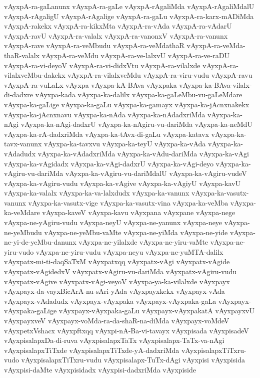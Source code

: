 {vAyxpA-ra-gaLanunx
vAyxpA-ra-gaLe
vAyxpA-rAgaliMda
vAyxpA-rAgaliMdalU
vAyxpA-rAgaligU
vAyxpA-rAgalige
vAyxpA-ra-gaLu
vAyxpA-ra-karx-mADiMda
vAyxpA-rakekx
vAyxpA-ra-kikxMta
vAyxpA-ra-vAda
vAyxpA-ra-vAdarU
vAyxpA-ravU
vAyxpA-ra-valalx
vAyxpA-ra-vanonxV
vAyxpA-ra-vanunx
vAyxpA-rave
vAyxpA-ra-veMbudu
vAyxpA-ra-veMdathaR
vAyxpA-ra-veMda-thaR-valalx
vAyxpA-ra-veMdu
vAyxpA-ra-ve-lalxvU
vAyxpA-ra-ve-raDU
vAyxpA-ra-vi-deyoV
vAyxpA-ra-vi-didxVtu
vAyxpA-ra-vilalxde
vAyxpA-ra-vilalxveMbu-dakekx
vAyxpA-ra-vilalxveMdu
vAyxpA-ra-viru-vudu
vAyxpA-ravu
vAyxpA-ra-vuLaLx
vAyxpa
vAyxpa-kA-BAva
vAyxpaka
vAyxpa-ka-BAva-vilalx-di-dadxre
vAyxpa-kada
vAyxpa-ka-dalilx
vAyxpa-ka-gaLeMbu-vu-gaLeMdare
vAyxpa-ka-gaLige
vAyxpa-ka-gaLu
vAyxpa-ka-gamayx
vAyxpa-ka-jAcnxnakekx
vAyxpa-ka-jAcnxnavu
vAyxpa-ka-nAda
vAyxpa-ka-nAdadxriMda
vAyxpa-ka-nAgi
vAyxpa-ka-nAgi-dadxrU
vAyxpa-ka-nAgiru-vu-dariMda
vAyxpa-ka-neMdU
vAyxpa-ka-rA-dadxriMda
vAyxpa-ka-tAvx-di-gaLu
vAyxpa-katavx
vAyxpa-ka-tavx-vanunx
vAyxpa-ka-tavxvu
vAyxpa-ka-teyU
vAyxpa-ka-vAda
vAyxpa-ka-vAdadudx
vAyxpa-ka-vAdadxriMda
vAyxpa-ka-vAdu-dariMda
vAyxpa-ka-vAgi
vAyxpa-ka-vAgidadx
vAyxpa-ka-vAgi-dadxrU
vAyxpa-ka-vAgi-deyo
vAyxpa-ka-vAgiru-vu-dariMda
vAyxpa-ka-vAgiru-vu-dariMdalU
vAyxpa-ka-vAgiru-vudeV
vAyxpa-ka-vAgiru-vudu
vAyxpa-ka-vAgive
vAyxpa-ka-vAgiyU
vAyxpa-kavU
vAyxpa-ka-valalx
vAyxpa-ka-va-lalxdudx
vAyxpa-ka-vanunx
vAyxpa-ka-vasutx-vanunx
vAyxpa-ka-vasutx-vige
vAyxpa-ka-vasutx-vina
vAyxpa-ka-veMba
vAyxpa-ka-veMdare
vAyxpa-kaveV
vAyxpa-kavu
vAyxpana
vAyxpane
vAyxpa-nege
vAyxpa-ne-yAgiru-vudu
vAyxpa-neyU
vAyxpa-ne-yanunx
vAyxpa-neye
vAyxpa-ne-yeMbudu
vAyxpa-ne-yeMbu-vaMte
vAyxpa-ne-yiMda
vAyxpa-ne-yide
vAyxpa-ne-yi-de-yeMbu-danunx
vAyxpa-ne-yilalxde
vAyxpa-ne-yiru-vaMte
vAyxpa-ne-yiru-vudo
vAyxpa-ne-yiru-vudu
vAyxpa-neyu
vAyxpa-ne-yuMTA-dalilx
vAyxpatx-mi-ti-daqSaTxM
vAyxpatxqq
vAyxpatx-vAgi
vAyxpatx-vAgide
vAyxpatx-vAgidedxV
vAyxpatx-vAgiru-vu-dariMda
vAyxpatx-vAgiru-vudu
vAyxpatx-vAgive
vAyxpatx-vAgi-veyoV
vAyxpa-ya-ka-vilalxde
vAyxpayx
vAyxpayx-da-vayxBicArA-nu-sAri-yAda
vAyxpayxkekx
vAyxpayx-vAda
vAyxpayx-vAdadudx
vAyxpayx-vAyxpaka
vAyxpayx-vAyxpaka-gaLa
vAyxpayx-vAyxpaka-gaLige
vAyxpayx-vAyxpaka-gaLu
vAyxpayx-vAyxpakatA
vAyxpayxvU
vAyxpayxveV
vAyxpayx-voMda-ra-da-shaR-na-diMda
vAyxpayx-voMdeV
vAyxpetxVshacx
vAyxpftxqq
vAyxpi-nA-Ba-vi-tavayx
vAyxpisada
vAyxpisadeV
vAyxpisalapxDa-di-ruva
vAyxpisalapxTaTx
vAyxpisalapx-TaTx-va-nAgi
vAyxpisalapxTiTxde
vAyxpisalapxTiTxde-yA-dadxriMda
vAyxpisalapxTiTxru-vudo
vAyxpisalapxTiTxru-vudu
vAyxpisalapx-TuTx-dAgi
vAyxpisi
vAyxpisida
vAyxpisi-daMte
vAyxpisidadx
vAyxpisi-dadxriMda
vAyxpiside
}
